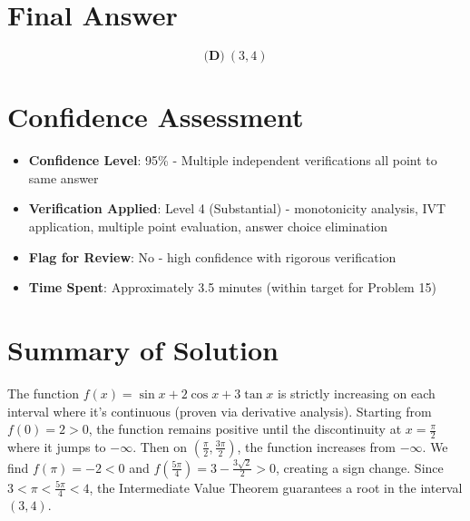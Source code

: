 \documentclass[]{article}
\begin{document}
\section*{Final Answer}
\[\boxed{\textbf{(D)}\ (3,4)}\]

\section*{Confidence Assessment}
\begin{itemize}[leftmargin=*]
    \item \textbf{Confidence Level}: 95\% - Multiple independent verifications all point to same answer
    \item \textbf{Verification Applied}: Level 4 (Substantial) - monotonicity analysis, IVT application, multiple point evaluation, answer choice elimination
    \item \textbf{Flag for Review}: No - high confidence with rigorous verification
    \item \textbf{Time Spent}: Approximately 3.5 minutes (within target for Problem 15)
\end{itemize}

\section*{Summary of Solution}
The function $f(x) = \sin x + 2\cos x + 3\tan x$ is strictly increasing on each interval where it's continuous (proven via derivative analysis). Starting from $f(0) = 2 > 0$, the function remains positive until the discontinuity at $x = \frac{\pi}{2}$ where it jumps to $-\infty$. Then on $(\frac{\pi}{2}, \frac{3\pi}{2})$, the function increases from $-\infty$. We find $f(\pi) = -2 < 0$ and $f(\frac{5\pi}{4}) = 3 - \frac{3\sqrt{2}}{2} > 0$, creating a sign change. Since $3 < \pi < \frac{5\pi}{4} < 4$, the Intermediate Value Theorem guarantees a root in the interval $(3, 4)$.
\end{document}
